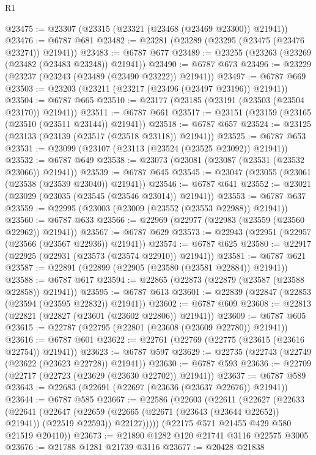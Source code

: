 \begin{lexlean}{R1}
\begin{coremodule}
@23475 := @23307 (@23315 (@23321 (@23468 (@23469 @23300)) @21941))
@23476 := @6787 @681
@23482 := @23281 (@23289 (@23295 (@23475 (@23476 @23274)) @21941))
@23483 := @6787 @677
@23489 := @23255 (@23263 (@23269 (@23482 (@23483 @23248)) @21941))
@23490 := @6787 @673
@23496 := @23229 (@23237 (@23243 (@23489 (@23490 @23222)) @21941))
@23497 := @6787 @669
@23503 := @23203 (@23211 (@23217 (@23496 (@23497 @23196)) @21941))
@23504 := @6787 @665
@23510 := @23177 (@23185 (@23191 (@23503 (@23504 @23170)) @21941))
@23511 := @6787 @661
@23517 := @23151 (@23159 (@23165 (@23510 (@23511 @23144)) @21941))
@23518 := @6787 @657
@23524 := @23125 (@23133 (@23139 (@23517 (@23518 @23118)) @21941))
@23525 := @6787 @653
@23531 := @23099 (@23107 (@23113 (@23524 (@23525 @23092)) @21941))
@23532 := @6787 @649
@23538 := @23073 (@23081 (@23087 (@23531 (@23532 @23066)) @21941))
@23539 := @6787 @645
@23545 := @23047 (@23055 (@23061 (@23538 (@23539 @23040)) @21941))
@23546 := @6787 @641
@23552 := @23021 (@23029 (@23035 (@23545 (@23546 @23014)) @21941))
@23553 := @6787 @637
@23559 := @22995 (@23003 (@23009 (@23552 (@23553 @22988)) @21941))
@23560 := @6787 @633
@23566 := @22969 (@22977 (@22983 (@23559 (@23560 @22962)) @21941))
@23567 := @6787 @629
@23573 := @22943 (@22951 (@22957 (@23566 (@23567 @22936)) @21941))
@23574 := @6787 @625
@23580 := @22917 (@22925 (@22931 (@23573 (@23574 @22910)) @21941))
@23581 := @6787 @621
@23587 := @22891 (@22899 (@22905 (@23580 (@23581 @22884)) @21941))
@23588 := @6787 @617
@23594 := @22865 (@22873 (@22879 (@23587 (@23588 @22858)) @21941))
@23595 := @6787 @613
@23601 := @22839 (@22847 (@22853 (@23594 (@23595 @22832)) @21941))
@23602 := @6787 @609
@23608 := @22813 (@22821 (@22827 (@23601 (@23602 @22806)) @21941))
@23609 := @6787 @605
@23615 := @22787 (@22795 (@22801 (@23608 (@23609 @22780)) @21941))
@23616 := @6787 @601
@23622 := @22761 (@22769 (@22775 (@23615 (@23616 @22754)) @21941))
@23623 := @6787 @597
@23629 := @22735 (@22743 (@22749 (@23622 (@23623 @22728)) @21941))
@23630 := @6787 @593
@23636 := @22709 (@22717 (@22723 (@23629 (@23630 @22702)) @21941))
@23637 := @6787 @589
@23643 := @22683 (@22691 (@22697 (@23636 (@23637 @22676)) @21941))
@23644 := @6787 @585
@23667 := @22586
    (@22603
      (@22611
        (@22627
          (@22633
            (@22641
              (@22647
                (@22659 (@22665 (@22671 (@23643 (@23644 @22652)) @21941)) (@22519 @22593))
                @22127)))))
      (@22175 @571 @21455 @429 @580 @21519 @20410))
@23673 := @21890 @1282 @120 @21741 @3116 @22575 @3005
@23676 := @21788 @1281 @21739 @3116
@23677 := @20428 @21838

\end{coremodule}
\end{lexlean}
